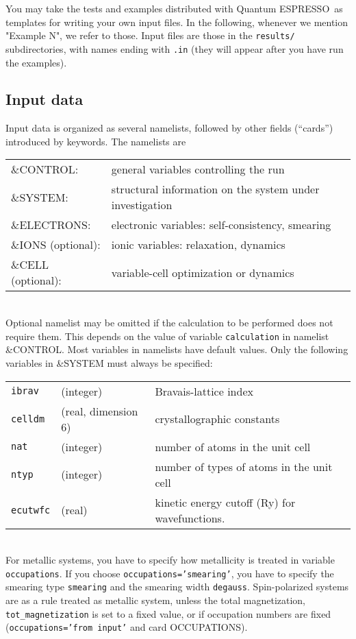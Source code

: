 \documentclass[12pt,a4paper]{article}
\def\qe{{\sc Quantum ESPRESSO}}
\begin{document}
You may take the tests and examples distributed 
with \qe\ as templates for writing your own input files.
In the following, whenever we mention "Example N", we refer to those. 
Input files are those in the \texttt{results/} subdirectories, with names ending
with \texttt{.in} 
(they will appear after you have run the examples).

\subsection{Input data}

Input data 
is organized as several namelists, followed by other fields (``cards'')
introduced by keywords. The namelists are

\begin{tabular}{ll}
      \&CONTROL:& general variables controlling the run\\
      \&SYSTEM: &structural information on the system under investigation\\
      \&ELECTRONS: &electronic variables: self-consistency, smearing\\
      \&IONS (optional): &ionic variables: relaxation, dynamics\\
      \&CELL (optional): &variable-cell optimization or dynamics\\
\end{tabular}    \\
Optional namelist may be omitted if the calculation to be performed
does not require them. This depends on the value of variable 
\texttt{calculation}
in namelist \&CONTROL. Most variables in namelists have default values. Only
the following variables in \&SYSTEM must always be specified:

\begin{tabular}{lll}
      \texttt{ibrav} & (integer)& Bravais-lattice index\\
      \texttt{celldm} &(real, dimension 6)& crystallographic constants\\
      \texttt{nat} &(integer)& number of atoms in the unit cell\\
      \texttt{ntyp} &(integer)& number of types of atoms in the unit cell\\
      \texttt{ecutwfc} &(real)& kinetic energy cutoff (Ry) for wavefunctions.
\end{tabular}    \\
For metallic systems, you have to specify how metallicity is treated
in
variable \texttt{occupations}. If you choose \texttt{occupations='smearing'},
you have
to specify the smearing type \texttt{smearing} and the smearing width 
\texttt{degauss}. Spin-polarized systems are as a rule treated as metallic 
system, unless the total magnetization, \texttt{tot\_magnetization}
is set to a fixed value, or if occupation numbers are fixed
(\texttt{occupations='from input'} and card OCCUPATIONS).
    
\end{document}
